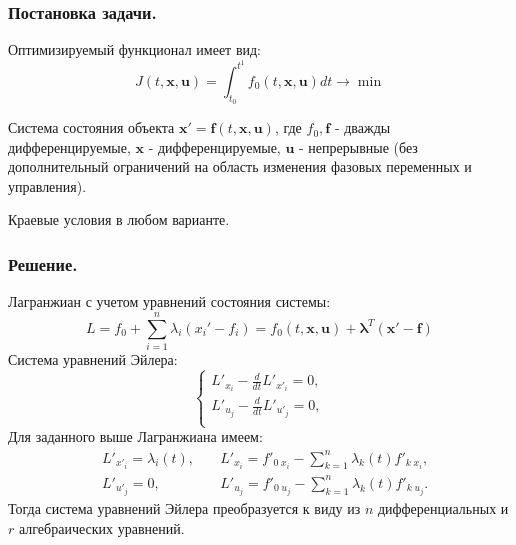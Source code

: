 
\subsubsection{Постановка задачи.}

Оптимизируемый функционал имеет вид:
\begin{equation*}
	J(t, \mathbf{x}, \mathbf{u})=\int_{t_0}^{t^1}f_0(t, \mathbf{x}, \mathbf{u})dt\to \min
\end{equation*}

Система состояния объекта $\mathbf{x'}=\mathbf{f}(t, \mathbf{x}, \mathbf{u})$, где $f_0, \mathbf{f}$ - дважды дифференцируемые, $\mathbf{x}$ - дифференцируемые, $\mathbf{u}$ - непрерывные (без дополнительный ограничений на область изменения фазовых переменных и управления).

Краевые условия в любом варианте.

\subsubsection{Решение.}
Лагранжиан с учетом уравнений состояния системы:
\begin{equation*}
	L=f_0+\sum_{i=1}^{n}\lambda_i (x_i'-f_i) = f_0(t, \mathbf{x}, \mathbf{u}) + \mathbf{\lambda}^T(\mathbf{x}'-\mathbf{f})
\end{equation*}
Система уравнений Эйлера:
\begin{equation*}
	\begin{cases}
		L'_{x_i}-\frac{d}{dt}L'_{x'_i}=0,\\
		L'_{u_j}-\frac{d}{dt}L'_{u'_j}=0,\\
	\end{cases}
\end{equation*}
Для заданного выше Лагранжиана имеем:
\begin{align}
	&L'_{x'_i}=\lambda_i(t),&\quad L'_{x_i}=f'_{0\;x_i}-\sum_{k=1}^{n}\lambda_k(t)f'_{k\;x_i},\\
	&L'_{u'_j}=0,&\quad L'_{u_j}=f'_{0\;u_j}-\sum_{k=1}^{n}\lambda_k(t)f'_{k\;u_j}.
\end{align}
Тогда система уравнений Эйлера преобразуется к виду из $n$ дифференциальных и $r$ алгебраических уравнений.
